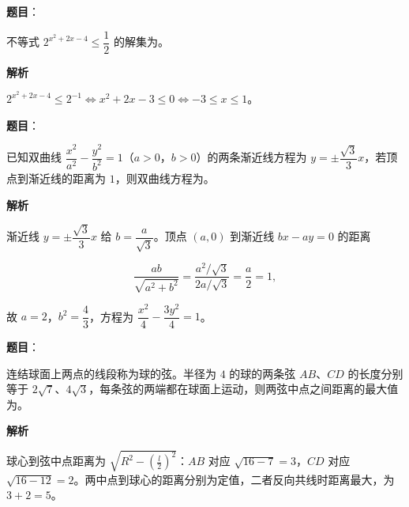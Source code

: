 \begin{answer}

\textbf{题目}：

不等式 $2^{x^2+2x-4}\leqslant\dfrac12$ 的解集为\gkblank{}。

\textbf{解析}

$2^{x^2+2x-4}\leqslant2^{-1}\iff x^2+2x-3\leqslant0\iff-3\leqslant x\leqslant1$。


\end{answer}
\begin{answer}

\textbf{题目}：

已知双曲线 $\dfrac{x^2}{a^2}-\dfrac{y^2}{b^2}=1$（$a>0$，$b>0$）的两条渐近线方程为 $y=\pm\dfrac{\sqrt3}3x$，若顶点到渐近线的距离为 $1$，则双曲线方程为\gkblank{}。

\textbf{解析}

渐近线 $y=\pm\dfrac{\sqrt3}3x$ 给 $b=\dfrac a{\sqrt3}$。顶点 $(a,0)$ 到渐近线 $bx-ay=0$ 的距离

\nopagebreak[4]
\[\frac{ab}{\sqrt{a^2+b^2}}=\frac{a^2/\sqrt3}{2a/\sqrt3}=\frac a2=1,\]

故 $a=2$，$b^2=\dfrac43$，方程为 $\dfrac{x^2}4-\dfrac{3y^2}4=1$。


\end{answer}
\begin{answer}

\textbf{题目}：

连结球面上两点的线段称为球的弦。半径为 $4$ 的球的两条弦 $AB$、$CD$ 的长度分别等于 $2\sqrt7$、$4\sqrt3$，每条弦的两端都在球面上运动，则两弦中点之间距离的最大值为\gkblank{}。

\textbf{解析}

球心到弦中点距离为 $\sqrt{R^2-\left(\frac l2\right)^2}$：$AB$ 对应 $\sqrt{16-7}=3$，$CD$ 对应 $\sqrt{16-12}=2$。两中点到球心的距离分别为定值，二者反向共线时距离最大，为 $3+2=5$。


\end{answer}
